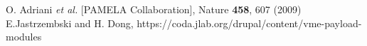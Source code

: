\documentclass{desyproc}
\begin{document}
 

\begin{footnotesize}

\begin{thebibliography}{99}
O. Adriani {\it et al.} [PAMELA Collaboration], Nature {\bf 458}, 607 (2009) 
E.Jastrzembski and H. Dong, https://coda.jlab.org/drupal/content/vme-payload-modules
\end{thebibliography}


\end{footnotesize}


 


\end{document}
